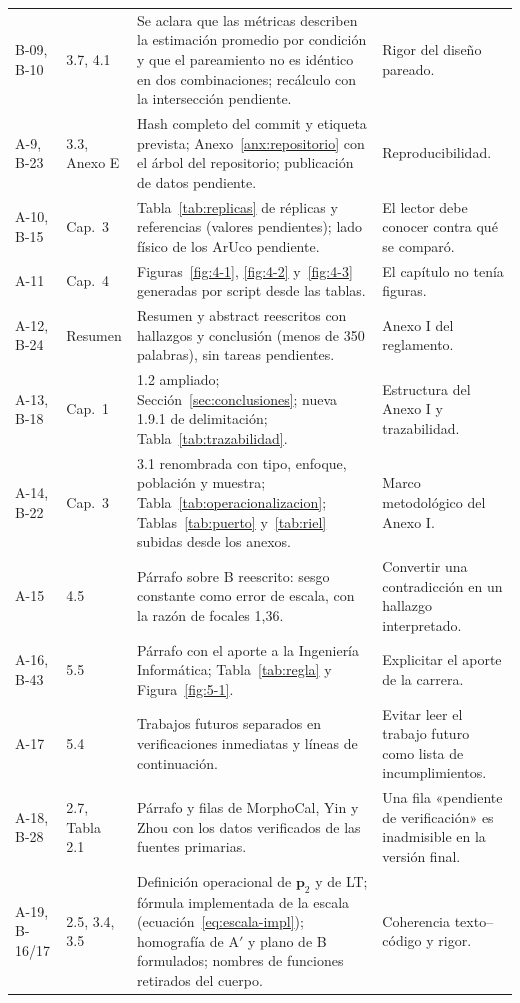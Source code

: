 \documentclass{report}
\newcommand{\Aprime}{A$'$}
\begin{document}
\begin{longtable}{@{}p{1.6cm}p{2.0cm}p{6.0cm}p{5.0cm}@{}}
B-09, B-10 & 3.7, 4.1 & Se aclara que las métricas describen la estimación promedio por condición y que el pareamiento no es idéntico en dos combinaciones; recálculo con la intersección pendiente. & Rigor del diseño pareado. \\
A-9, B-23 & 3.3, Anexo E & Hash completo del commit y etiqueta prevista; Anexo~\ref{anx:repositorio} con el árbol del repositorio; publicación de datos pendiente. & Reproducibilidad. \\
A-10, B-15 & Cap.~3 & Tabla~\ref{tab:replicas} de réplicas y referencias (valores pendientes); lado físico de los ArUco pendiente. & El lector debe conocer contra qué se comparó. \\
A-11 & Cap.~4 & Figuras~\ref{fig:4-1}, \ref{fig:4-2} y~\ref{fig:4-3} generadas por script desde las tablas. & El capítulo no tenía figuras. \\
A-12, B-24 & Resumen & Resumen y abstract reescritos con hallazgos y conclusión (menos de 350 palabras), sin tareas pendientes. & Anexo I del reglamento. \\
A-13, B-18 & Cap.~1 & 1.2 ampliado; Sección~\ref{sec:conclusiones}; nueva 1.9.1 de delimitación; Tabla~\ref{tab:trazabilidad}. & Estructura del Anexo I y trazabilidad. \\
A-14, B-22 & Cap.~3 & 3.1 renombrada con tipo, enfoque, población y muestra; Tabla~\ref{tab:operacionalizacion}; Tablas~\ref{tab:puerto} y~\ref{tab:riel} subidas desde los anexos. & Marco metodológico del Anexo I. \\
A-15 & 4.5 & Párrafo sobre B reescrito: sesgo constante como error de escala, con la razón de focales 1,36. & Convertir una contradicción en un hallazgo interpretado. \\
A-16, B-43 & 5.5 & Párrafo con el aporte a la Ingeniería Informática; Tabla~\ref{tab:regla} y Figura~\ref{fig:5-1}. & Explicitar el aporte de la carrera. \\
A-17 & 5.4 & Trabajos futuros separados en verificaciones inmediatas y líneas de continuación. & Evitar leer el trabajo futuro como lista de incumplimientos. \\
A-18, B-28 & 2.7, Tabla 2.1 & Párrafo y filas de MorphoCal, Yin y Zhou con los datos verificados de las fuentes primarias. & Una fila «pendiente de verificación» es inadmisible en la versión final. \\
A-19, B-16/17 & 2.5, 3.4, 3.5 & Definición operacional de $\mathbf{p}_2$ y de LT; fórmula implementada de la escala (ecuación~\ref{eq:escala-impl}); homografía de \Aprime{} y plano de B formulados; nombres de funciones retirados del cuerpo. & Coherencia texto--código y rigor. \\

\end{longtable}
\end{document}
